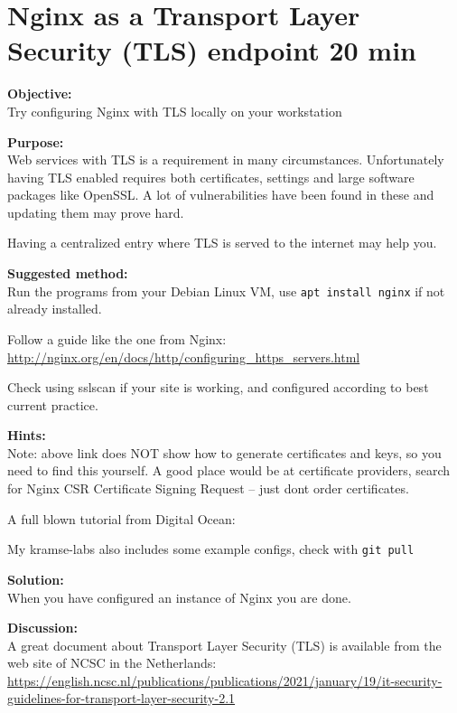 \documentclass[a4paper,11pt,notitlepage]{report}
\begin{document}
\chapter{Nginx as a Transport Layer Security (TLS) endpoint 20 min}
\label{ex:nginx-tls}

{\bf Objective:}\\
Try configuring Nginx with TLS locally on your workstation


{\bf Purpose:}\\
Web services with TLS is a requirement in many circumstances. Unfortunately having TLS enabled requires both certificates, settings and large software packages like OpenSSL. A lot of vulnerabilities have been found in these and updating them may prove hard.

Having a centralized entry where TLS is served to the internet may help you.

{\bf Suggested method:}\\
Run the programs from your Debian Linux VM, use \verb+apt install nginx+ if not already installed.

Follow a guide like the one from Nginx:\\
\url{http://nginx.org/en/docs/http/configuring_https_servers.html}

Check using sslscan if your site is working, and configured according to best current practice.

{\bf Hints:}\\
Note: above link does NOT show how to generate certificates and keys, so you need to find this yourself. A good place would be at certificate providers, search for Nginx CSR Certificate Signing Request -- just dont order certificates.

A full blown tutorial from Digital Ocean:\\

My kramse-labs also includes some example configs, check with \verb+git pull+

{\bf Solution:}\\
When you have configured an instance of Nginx you are done.

{\bf Discussion:}\\
A great document about Transport Layer Security (TLS) is available from the web site of NCSC in the Netherlands:\\
{\scriptsize\url{https://english.ncsc.nl/publications/publications/2021/january/19/it-security-guidelines-for-transport-layer-security-2.1}}
\end{document}
